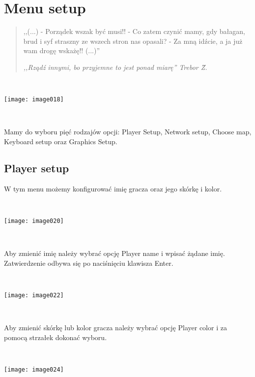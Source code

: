 \documentclass[licencjacka]{pracamgr}
\begin{document}
\section{Menu setup}

\begin{quote}

  ,,(...)
\newline- Porządek wszak być musi!!
\newline- Co zatem czynić mamy, gdy bałagan, brud i syf straszny ze wszech stron nas opasali?
\newline- Za mną idźcie, a ja już wam drogę wskażę!! (...)''
  \ \

\raggedleft\slshape ,,Rządź innymi, bo przyjemne to jest ponad miarę'' Trebor \~Z.
\end{quote}

\begin{center}
\ \

\texttt{[image: image018]}
\end{center}

\ \

Mamy do wyboru pięć rodzajów opcji: Player Setup, Network setup, Choose map, Keyboard setup oraz Graphics Setup.

\subsection{Player setup}

W tym menu możemy konfigurować imię gracza oraz jego skórkę i kolor.

\begin{center}
\ \

\texttt{[image: image020]}
\end{center}

\ \

Aby zmienić imię należy wybrać opcję Player name i wpisać żądane imię. Zatwierdzenie odbywa się po naciśnięciu klawisza Enter.

\begin{center}
\ \

\texttt{[image: image022]}
\end{center}

\ \

Aby zmienić skórkę lub kolor gracza należy wybrać opcję Player color i za pomocą strzałek dokonać wyboru.

\begin{center}
\ \

\texttt{[image: image024]}
\end{center}
\end{document}
